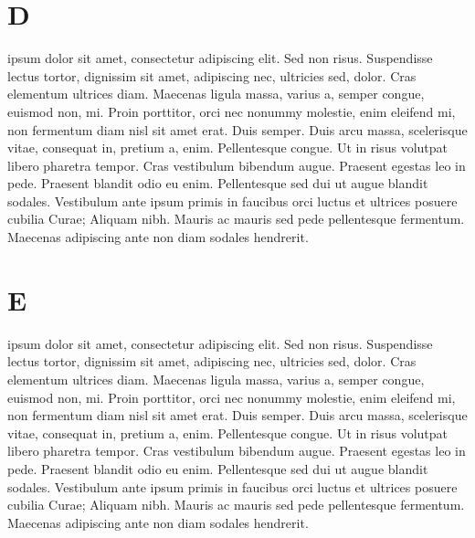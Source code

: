 \documentclass{article}
\begin{document}
\pend
\endnumbering

\section{D}


\beginnumbering
\pstart
{}       ipsum dolor sit amet, consectetur adipiscing elit. Sed non risus. Suspendisse lectus tortor, dignissim sit amet, adipiscing nec, ultricies sed, dolor. Cras elementum ultrices diam. Maecenas ligula massa, varius a, semper congue, euismod non, mi. Proin porttitor, orci nec nonummy molestie, enim  eleifend mi, non fermentum diam nisl sit amet erat. Duis semper. Duis arcu massa, scelerisque vitae, consequat in, pretium a, enim. Pellentesque congue. Ut in risus volutpat libero pharetra tempor. Cras vestibulum bibendum augue. Praesent egestas leo in pede. Praesent blandit odio eu enim. Pellentesque sed dui ut augue blandit sodales. Vestibulum ante ipsum primis in faucibus orci luctus et ultrices posuere cubilia Curae; Aliquam nibh. Mauris ac mauris sed pede pellentesque fermentum. Maecenas adipiscing ante non diam sodales hendrerit. 

\pend
\endnumbering

\section{E}


\beginnumbering
\pstart
{}       ipsum dolor sit amet, consectetur adipiscing elit. Sed non risus. Suspendisse lectus tortor, dignissim sit amet, adipiscing nec, ultricies sed, dolor. Cras elementum ultrices diam. Maecenas ligula massa, varius a, semper congue, euismod non, mi. Proin porttitor, orci nec nonummy molestie, enim  eleifend mi, non fermentum diam nisl sit amet erat. Duis semper. Duis arcu massa, scelerisque vitae, consequat in, pretium a, enim. Pellentesque congue. Ut in risus volutpat libero pharetra tempor. Cras vestibulum bibendum augue. Praesent egestas leo in pede. Praesent blandit odio eu enim. Pellentesque sed dui ut augue blandit sodales. Vestibulum ante ipsum primis in faucibus orci luctus et ultrices posuere cubilia Curae; Aliquam nibh. Mauris ac mauris sed pede pellentesque fermentum. Maecenas adipiscing ante non diam sodales hendrerit. 
\end{document}
